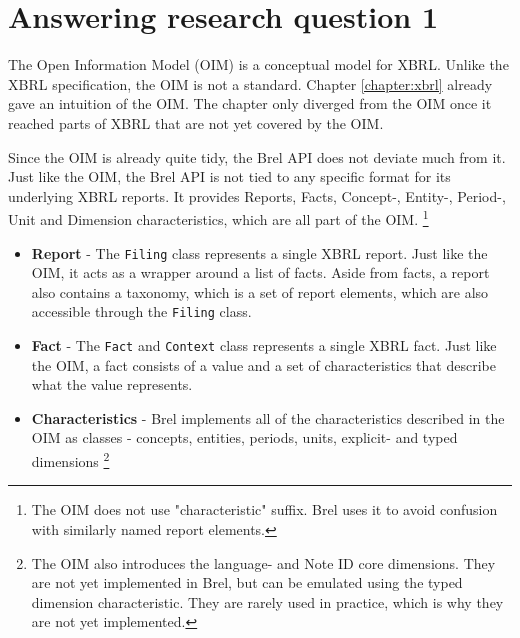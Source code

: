 \section{Answering research question 1}
\label{sec:answer_research_question_1}

The Open Information Model (OIM) is a conceptual model for XBRL.\cite{oim}
Unlike the XBRL specification, the OIM is not a standard.
Chapter \ref{chapter:xbrl} already gave an intuition of the OIM.
The chapter only diverged from the OIM once it reached parts of XBRL that are not yet covered by the OIM.

Since the OIM is already quite tidy, the Brel API does not deviate much from it.
Just like the OIM, the Brel API is not tied to any specific format for its underlying XBRL reports.
It provides Reports, Facts, Concept-, Entity-, Period-, Unit and Dimension characteristics, which are all part of the OIM.
\footnote{The OIM does not use "characteristic" suffix. Brel uses it to avoid confusion with similarly named report elements.}

\begin{itemize}
    \item \textbf{Report} - The \texttt{Filing} class represents a single XBRL report. 
    Just like the OIM, it acts as a wrapper around a list of facts.
    Aside from facts, a report also contains a taxonomy, which is a set of report elements, which are also accessible through the \texttt{Filing} class.
    \item \textbf{Fact} - The \texttt{Fact} and \texttt{Context} class represents a single XBRL fact.
    Just like the OIM, a fact consists of a value and a set of characteristics that describe what the value represents.
    \item \textbf{Characteristics} - Brel implements all of the characteristics described in the OIM as classes - 
    concepts, entities, periods, units, explicit- and typed dimensions
    \footnote{The OIM also introduces the language- and Note ID core dimensions. They are not yet implemented in Brel, but can be emulated using the typed dimension characteristic. They are rarely used in practice, which is why they are not yet implemented.}
\end{itemize}

